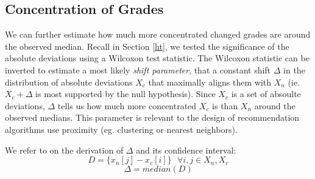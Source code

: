 \subsection{Concentration of Grades}
We can further estimate how much more concentrated changed grades are around the observed median.
Recall in Section \ref{ht}, we tested the significance of the absolute deviations using a Wilcoxon test statistic.
The Wilcoxon statistic can be inverted to estimate a most likely \emph{shift parameter}, that a constant shift $\Delta$ in the distribution of absolute deviations $X_c$ that maximally aligns them with $X_n$ (ie. $X_c + \Delta$ is most supported by the null hypothesis). 
Since $X_c$ is a set of absoulte deviations, $\Delta$ tells us how much more concentrated $X_c$ is than $X_n$ around the observed medians.
This parameter is relevant to the design of recommendation algorithms use proximity (eg. clustering or nearest neighbors).

We refer to \cite{???} on the derivation of $\Delta$ and its confidence interval:
\begin{equation}
D = \{x_n[j] - x_c[i]\} \text{ } \forall i,j \in X_n, X_c
\end{equation}
\begin{equation}
\Delta = median(D)
\end{equation}





